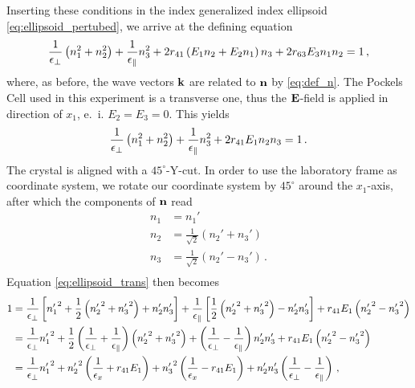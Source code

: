 Inserting these conditions in the index generalized index ellipsoid 
\eqref{eq:ellipsoid_pertubed}, 
we arrive at the defining equation
\begin{equation}
    \frac{1}{\epsilon_\perp}\left(n_1^2 + n_2^2\right) + 
    \frac{1}{\epsilon_\parallel} n_3^2 + 
    2 r_{41} \left(E_1 n_2 + E_2 n_1\right)n_3 + 
    2 r_{63} E_3 n_1 n_2  = 1\, ,
    \label{eq:ellipsoid_red}
\end{equation}
where, as before, the wave vectors $\mathbf{k}$ are related to 
$\mathbf{n}$ by \eqref{eq:def_n}. 
The Pockels Cell used in this experiment is a transverse one, 
thus the $\mathbf{E}$-field is applied in direction of $x_1$, e.~i. 
$E_2 = E_3 = 0$. This yields
\begin{equation}
    \frac{1}{\epsilon_\perp}\left(n_1^2 + n_2^2\right) + 
    \frac{1}{\epsilon_\parallel} n_3^2 + 
    2 r_{41} E_1 n_2 n_3  = 1 \, .
    \label{eq:ellipsoid_trans}
\end{equation}
The crystal is aligned with a $45^\circ$-Y-cut. In order to 
use the laboratory frame as coordinate system, we rotate our 
coordinate system by $45^\circ$ around the $x_1$-axis, 
after which the components of $\mathbf{n}$ read
\begin{align}
    n_1 &= n_1'  \\
    n_2 &= \frac{1}{\sqrt{2}}\left(n_2' + n_3'\right) \\
    n_3 &= \frac{1}{\sqrt{2}}\left(n_2' - n_3'\right) \, .\\
    \label{eq:trans_ycut}
\end{align}
Equation \eqref{eq:ellipsoid_trans} then becomes
\begin{align}
    1 &= 
    \frac{1}{\epsilon_\perp}
    \left[ {n_1'}^2 + 
    \frac{1}{2} \left({n_2'}^2 + {n_3'}^2 \right) + 
    {n_2'}{n_3'} \right] + 
    \frac{1}{\epsilon_\parallel}
    \left[\frac{1}{2} \left({n_2'}^2 + {n_3'}^2 \right) -  
    {n_2'}{n_3'} \right] + 
    r_{41} E_1 \left({n_2'}^2 - {n_3'}^2\right) 
    \nonumber \\
    &= 
    \frac{1}{\epsilon_\perp} {n_1'}^2 + 
    \frac{1}{2} \left(\frac{1}{\epsilon_\perp} + \frac{1}{\epsilon_\parallel}\right)
    \left({n_2'}^2 + {n_3'}^2 \right) + 
    \left( \frac{1}{\epsilon_\perp} - \frac{1}{\epsilon_\parallel}\right)
    {n_2'}{n_3'}  + 
    r_{41} E_1 \left({n_2'}^2 - {n_3'}^2\right) 
    \nonumber \\
    &= 
    \frac{1}{\epsilon_\perp}  {n_1'}^2 + 
    {n_2'}^2 \left(\frac{1}{\epsilon_x} + r_{41} E_1 \right) +
    {n_3'}^2 \left(\frac{1}{\epsilon_x} - r_{41} E_1 \right) +
    {n_2'}{n_3'} \left( \frac{1}{\epsilon_\perp} - \frac{1}{\epsilon_\parallel}\right) \, ,
    \label{eq:ell_calc}
\end{align}
